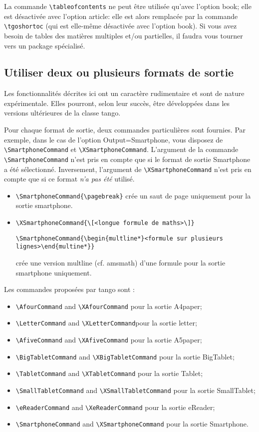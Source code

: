 \documentclass[french,ColorTheme=USAF,FontSize=10pt]{tango}
\newcommand\TO[1]{\textsf{#1}}
\begin{document}
La commande \verb+\tableofcontents+ ne peut être utilisée qu'avec l'option \TO{book}; elle est désactivée avec l'option \TO{article}: elle est alors remplacée par la commande \verb+\tgoshortoc+ (qui est elle-même désactivée avec l'option \TO{book}). Si vous avez besoin de tables des matières multiples et/ou partielles, il faudra vous tourner vers un package spécialisé.

\subsection{Utiliser deux ou plusieurs formats de sortie}
Les fonctionnalités décrites ici ont un caractère rudimentaire et sont de nature expérimentale. Elles pourront, selon leur succès, être développées dans les versions ultérieures de la classe tango.

Pour chaque format de sortie, deux commandes particulières sont fournies. Par exemple, dans le cas de l'option  \TO{Output=Smartphone}, vous disposez de \verb+\SmartphoneCommand+ et \verb+\XSmartphoneCommand+. L'argument de la commande  \verb+\SmartphoneCommand+ n'est pris en compte que si le format de sortie \TO{Smartphone} a été sélectionné. Inversement, l'argument de \verb+\XSmartphoneCommand+ n'est pris en compte que si ce format \emph{n'a pas été} utilisé.
\begin{example}[Exemples]
\begin{itemize}
\item \verb+\SmartphoneCommand{\pagebreak}+ crée un saut de page uniquement pour la sortie smartphone. 
\item \verb+\XSmartphoneCommand{\[<longue formule de maths>\]}+
\par \verb+\SmartphoneCommand{\begin{multline*}<formule sur plusieurs lignes>\end{multine*}}+
\par crée une version \TO{multline} (cf. \TO{amsmath}) d'une formule pour la sortie smartphone uniquement.
\end{itemize}
\end{example}

Les commandes proposées par tango sont :
\begin{itemize}
\item\verb+\AfourCommand+ and \verb+\XAfourCommand+ pour la sortie A4paper;
\item\verb+\LetterCommand+ and \verb+\XLetterCommand+pour la sortie letter;
\item\verb+\AfiveCommand+ and \verb+\XAfiveCommand+ pour la sortie A5paper;
\item\verb+\BigTabletCommand+ and \verb+\XBigTabletCommand+ pour la sortie BigTablet;
\item\verb+\TabletCommand+ and \verb+\XTabletCommand+ pour la sortie Tablet;
\item\verb+\SmallTabletCommand+ and \verb+\XSmallTabletCommand+ pour la sortie SmallTablet;
\item\verb+\eReaderCommand+ and \verb+\XeReaderCommand+ pour la sortie eReader;
\item\verb+\SmartphoneCommand+ and \verb+\XSmartphoneCommand+ pour la sortie Smartphone.
\end{itemize}
\end{document}
